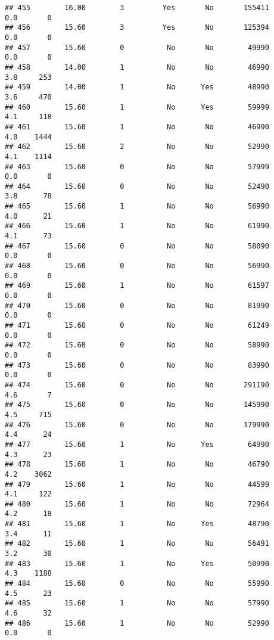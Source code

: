\documentclass[
]{article}
\begin{document}
\begin{verbatim}
## 455        16.00        3         Yes       No       155411         0.0       0
## 456        15.60        3         Yes       No       125394         0.0       0
## 457        15.60        0          No       No        49990         0.0       0
## 458        14.00        1          No       No        46990         3.8     253
## 459        14.00        1          No      Yes        48990         3.6     470
## 460        15.60        1          No      Yes        59999         4.1     118
## 461        15.60        1          No       No        46990         4.0    1444
## 462        15.60        2          No       No        52990         4.1    1114
## 463        15.60        0          No       No        57999         0.0       0
## 464        15.60        0          No       No        52490         3.8      78
## 465        15.60        1          No       No        56990         4.0      21
## 466        15.60        1          No       No        61990         4.1      73
## 467        15.60        0          No       No        58090         0.0       0
## 468        15.60        0          No       No        56990         0.0       0
## 469        15.60        1          No       No        61597         0.0       0
## 470        15.60        0          No       No        81990         0.0       0
## 471        15.60        0          No       No        61249         0.0       0
## 472        15.60        0          No       No        58990         0.0       0
## 473        15.60        0          No       No        83990         0.0       0
## 474        15.60        0          No       No       291190         4.6       7
## 475        15.60        0          No       No       145990         4.5     715
## 476        15.60        0          No       No       179990         4.4      24
## 477        15.60        1          No      Yes        64990         4.3      23
## 478        15.60        1          No       No        46790         4.2    3062
## 479        15.60        1          No       No        44599         4.1     122
## 480        15.60        1          No       No        72964         4.2      18
## 481        15.60        1          No      Yes        48790         3.4      11
## 482        15.60        1          No       No        56491         3.2      30
## 483        15.60        1          No      Yes        50990         4.3    1188
## 484        15.60        0          No       No        55990         4.5      23
## 485        15.60        1          No       No        57990         4.6      32
## 486        15.60        1          No       No        52990         0.0       0

\end{verbatim}
\end{document}
